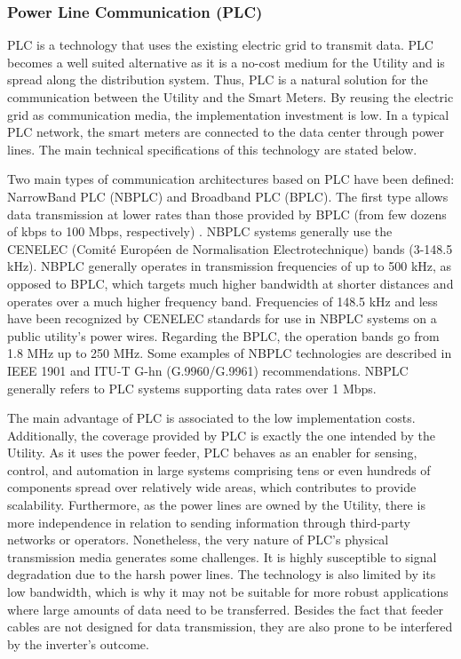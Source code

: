 \documentclass[11pt,draftclsnofoot,onecolumn]{IEEEtran}
\begin{document}
\subsubsection{Power Line Communication (PLC)}\label{tech::plc}

PLC is a technology that uses the existing electric grid to transmit data. PLC becomes a well suited alternative as it is a no-cost medium for the Utility and is spread along the distribution system. Thus, PLC is a natural solution for the communication between the Utility and the Smart Meters. By reusing the electric grid as communication media, the implementation investment is low. In a typical PLC network, the smart meters are connected to the data center through power lines. The main technical specifications of this technology are stated below.

Two main types of communication architectures based on PLC have been defined: NarrowBand PLC (NBPLC) and Broadband PLC (BPLC). The first type allows data transmission at lower rates than those provided by BPLC (from few dozens of kbps to 100 Mbps, respectively) \cite{Sabbah2014}. NBPLC systems generally use the CENELEC (Comité Européen de Normalisation Electrotechnique) bands (3-148.5 kHz). NBPLC generally operates in transmission frequencies of up to 500 kHz, as opposed to BPLC, which targets much higher bandwidth at shorter distances and operates over a much higher frequency band. Frequencies of 148.5 kHz and less have been recognized by CENELEC standards for use in NBPLC systems on a public utility's power wires. Regarding the BPLC, the operation bands go from 1.8 MHz up to 250 MHz. Some examples of NBPLC technologies are described in IEEE 1901 and ITU-T G-hn (G.9960/G.9961) recommendations. NBPLC generally refers to PLC systems supporting data rates over 1 Mbps.

The main advantage of PLC is associated to the low implementation costs. Additionally, the coverage provided by PLC is exactly the one intended by the Utility. As it uses the power feeder, PLC behaves as an enabler for sensing, control, and automation in large systems comprising tens or even hundreds of components spread over relatively wide areas, which contributes to provide scalability. Furthermore, as the power lines are owned by the Utility, there is more independence in relation to sending information through third-party networks or operators. Nonetheless, the very nature of  PLC's physical transmission media generates some challenges. It is highly susceptible to signal degradation due to the harsh power lines. The technology is also limited by its low bandwidth, which is why it may not be suitable for more robust applications where large amounts of data need to be transferred. Besides the fact that feeder cables are not designed for data transmission, they are also prone to be interfered by the inverter’s outcome. %
\end{document}
